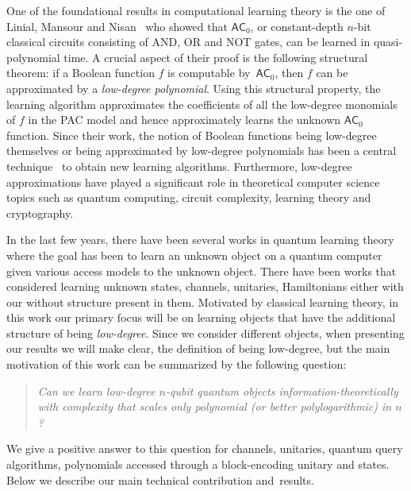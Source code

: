 \documentclass[11pt]{article}
\theoremstyle{plain}
\theoremstyle{plain}
\theoremstyle{definition}
\theoremstyle{remark}
\theoremstyle{named}
\begin{document}
One of the foundational results in computational learning theory is the one of Linial, Mansour and Nisan~\cite{linial1993constant} who showed that $\textsf{AC}_0$, or constant-depth $n$-bit classical circuits consisting of AND, OR and NOT gates, can be learned in quasi-polynomial time.  A crucial aspect of their proof is the following structural theorem: if a Boolean function $f$ is computable by~$\textsf{AC}_0$, then $f$ can be approximated by a \emph{low-degree polynomial}. Using this structural property, the learning algorithm  approximates the coefficients of all the low-degree monomials of $f$ in the PAC model and hence approximately learns the unknown $\textsf{AC}_0$ function. Since their work, the notion of  Boolean functions being low-degree themselves or being approximated by low-degree polynomials has been a central technique~\cite{bun2021guest} to obtain new learning algorithms. Furthermore, low-degree approximations have played a significant role  in theoretical computer science topics such as quantum computing, circuit complexity, learning theory and cryptography. 

In the last few years, there have been several works in quantum learning theory where the goal has been to learn an unknown object on a quantum computer given various access models to the unknown object. There have been works that considered learning unknown states, channels, unitaries, Hamiltonians either with our without structure present in them. Motivated by classical learning theory, in this work our primary focus will be on learning objects that have the additional structure of being \emph{low-degree}. Since we consider different objects, when presenting our results we  will make clear, the definition of being low-degree, but the main motivation of this work can be summarized by the following question:

\begin{quote}
\centering
\emph{Can we learn low-degree $n$-qubit quantum objects information-theoretically with complexity that scales only polynomial (or better polylogarithmic) in $n$?} 
\end{quote}
We give a positive answer to this question for channels, unitaries, quantum query algorithms, polynomials accessed through a block-encoding unitary and states. Below we describe our main technical contribution and~results. 
\end{document}
